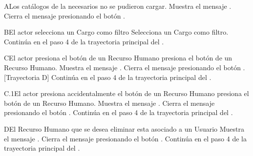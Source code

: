 \begin{UCtrayectoriaA}{A}{Los catálogos de la  necesarios no se pudieron cargar.}
    \UCpaso Muestra el mensaje .
    \UCpaso[\UCactor] Cierra el mensaje presionando el botón .
\end{UCtrayectoriaA}
\begin{UCtrayectoriaA}{B}{El actor selecciona un Cargo como filtro}
    \UCpaso[\UCactor] Selecciona un Cargo como filtro.
    \UCpaso Continúa en el paso 4 de la trayectoria principal del .
\end{UCtrayectoriaA}
\begin{UCtrayectoriaA}{C}{El actor presiona el botón  de un Recurso Humano}
    \UCpaso[\UCactor] presiona el botón  de un Recurso Humano.
    \UCpaso Muestra el mensaje .
    \UCpaso[\UCactor] Cierra el mensaje presionando el botón .[Trayectoria D]
    \UCpaso Continúa en el paso 4 de la trayectoria principal del .
\end{UCtrayectoriaA}
\begin{UCtrayectoriaA}{C.1}{El actor presiona accidentalmente el botón  de un Recurso Humano}
    \UCpaso[\UCactor] presiona el botón  de un Recurso Humano.
    \UCpaso Muestra el mensaje .
    \UCpaso[\UCactor] Cierra el mensaje presionando el botón .
    \UCpaso Continúa en el paso 4 de la trayectoria principal del .
\end{UCtrayectoriaA}
\begin{UCtrayectoriaA}{D}{El Recurso Humano que se desea eliminar esta asociado a un Usuario}
    \UCpaso Muestra el mensaje .
    \UCpaso[\UCactor] Cierra el mensaje presionando el botón .
    \UCpaso Continúa en el paso 4 de la trayectoria principal del .
\end{UCtrayectoriaA}